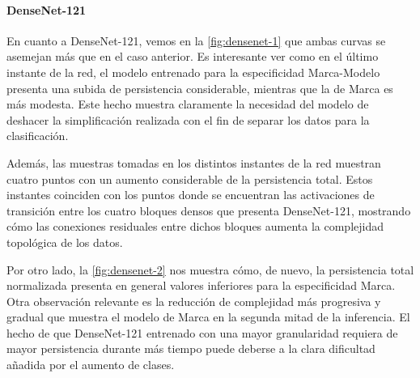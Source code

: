 \paragraph{DenseNet-121}

En cuanto a DenseNet-121, vemos en la \autoref{fig:densenet-1} que ambas curvas
se asemejan más que en el caso anterior. Es interesante ver como en el último instante
de la red, el modelo entrenado para la especificidad Marca-Modelo presenta una
subida de persistencia considerable, mientras que la de Marca es más modesta.
Este hecho muestra claramente la necesidad del modelo de deshacer la
simplificación realizada con el fin de separar los datos para la clasificación.

Además, las muestras tomadas en los distintos instantes de la red muestran cuatro
puntos con un aumento considerable de la persistencia total. Estos instantes
coinciden con los puntos donde se encuentran las activaciones de transición
entre los cuatro bloques densos que presenta DenseNet-121, mostrando cómo las conexiones
residuales entre dichos bloques aumenta la complejidad topológica de los datos.

Por otro lado, la \autoref{fig:densenet-2} nos muestra cómo, de nuevo, la
persistencia total normalizada presenta en general valores inferiores para la
especificidad Marca. Otra observación relevante es la reducción de complejidad más
progresiva y gradual que muestra el modelo de Marca en la segunda mitad de la inferencia.
El hecho de que DenseNet-121 entrenado con una mayor granularidad requiera de
mayor persistencia durante más tiempo puede deberse a la clara dificultad
añadida por el aumento de clases.

